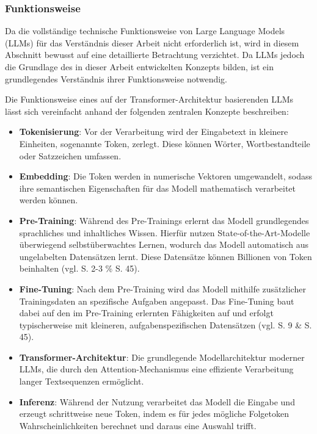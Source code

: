 \subsubsection{Funktionsweise}

Da die vollständige technische Funktionsweise von Large Language Models (LLMs) für das Verständnis dieser Arbeit nicht erforderlich ist, wird in diesem Abschnitt bewusst auf eine detaillierte Betrachtung verzichtet. Da LLMs jedoch die Grundlage des in dieser Arbeit entwickelten Konzepts bilden, ist ein grundlegendes Verständnis ihrer Funktionsweise notwendig.

Die Funktionsweise eines auf der Transformer-Architektur basierenden LLMs lässt sich vereinfacht anhand der folgenden zentralen Konzepte beschreiben:

\begin{itemize}
	\item \textbf{Tokenisierung}: Vor der Verarbeitung wird der Eingabetext in kleinere Einheiten, sogenannte Token, zerlegt. Diese können Wörter, Wortbestandteile oder Satzzeichen umfassen.
	
	\item \textbf{Embedding}: Die Token werden in numerische Vektoren umgewandelt, sodass ihre semantischen Eigenschaften für das Modell mathematisch verarbeitet werden können.
	
	\item \textbf{Pre-Training}: Während des Pre-Trainings erlernt das Modell grundlegendes sprachliches und inhaltliches Wissen. Hierfür nutzen State-of-the-Art-Modelle überwiegend selbstüberwachtes Lernen, wodurch das Modell automatisch aus ungelabelten Datensätzen lernt. Diese Datensätze können Billionen von Token beinhalten (vgl. \cite{xiao2025foundationslargelanguagemodels} S. 2-3 \% S. 45).
	
	\item \textbf{Fine-Tuning}: Nach dem Pre-Training wird das Modell mithilfe zusätzlicher Trainingsdaten an spezifische Aufgaben angepasst. Das Fine-Tuning baut dabei auf den im Pre-Training erlernten Fähigkeiten auf und erfolgt typischerweise mit kleineren, aufgabenspezifischen Datensätzen (vgl. \cite{A_Survey_of_llms_techniques_apps_and_challenges} S. 9 \& \cite{xiao2025foundationslargelanguagemodels} S. 45).
	
	\item \textbf{Transformer-Architektur}: Die grundlegende Modellarchitektur moderner LLMs, die durch den Attention-Mechanismus eine effiziente Verarbeitung langer Textsequenzen ermöglicht.
	
	\item \textbf{Inferenz}: Während der Nutzung verarbeitet das Modell die Eingabe und erzeugt schrittweise neue Token, indem es für jedes mögliche Folgetoken Wahrscheinlichkeiten berechnet und daraus eine Auswahl trifft.
\end{itemize}

